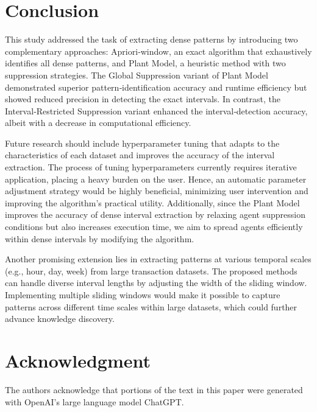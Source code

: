 \section{Conclusion}
\label{conclusion}
This study addressed the task of extracting dense patterns by introducing two complementary approaches: Apriori‑window, an exact algorithm that exhaustively identifies all dense patterns, and Plant Model, a heuristic method with two suppression strategies. The Global Suppression variant of Plant Model demonstrated superior pattern‑identification accuracy and runtime efficiency but showed reduced precision in detecting the exact intervals. In contrast, the Interval‑Restricted Suppression variant enhanced the interval‑detection accuracy, albeit with a decrease in computational efficiency. 

Future research should include hyperparameter tuning that adapts to the characteristics of each dataset and improves the accuracy of the interval extraction. The process of tuning hyperparameters currently requires iterative application, placing a heavy burden on the user. Hence, an automatic parameter adjustment strategy would be highly beneficial, minimizing user intervention and improving the algorithm’s practical utility. Additionally, since the Plant Model improves the accuracy of dense interval extraction by relaxing agent suppression conditions but also increases execution time, we aim to spread agents efficiently within dense intervals by modifying the algorithm.

Another promising extension lies in extracting patterns at various temporal scales (e.g., hour, day, week) from large transaction datasets. The proposed methods can handle diverse interval lengths by adjusting the width of the sliding window. Implementing multiple sliding windows would make it possible to capture patterns across different time scales within large datasets, which could further advance knowledge discovery. 

\section*{Acknowledgment}
The authors acknowledge that portions of the text in this paper were generated with OpenAI’s large language model ChatGPT.
